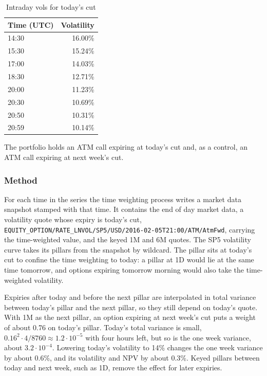 \documentclass[12pt, a4paper]{article}
\begin{document}
\begin{table}[hbt]
\centering
\begin{tabular}{|l|r|}
\hline
Time (UTC) & Volatility \\
\hline
14:30 & 16.00\% \\
15:30 & 15.24\% \\
17:00 & 14.03\% \\
18:30 & 12.71\% \\
20:00 & 11.23\% \\
20:30 & 10.69\% \\
20:50 & 10.31\% \\
20:59 & 10.14\% \\
\hline
\end{tabular}
\caption{Intraday vols for today's cut}
\label{tab:decayseries}
\end{table}

The portfolio holds an ATM call expiring at today's cut and, as a control, an ATM call expiring at next week's cut.

\subsubsection*{Method}

For each time in the series the time weighting process writes a market data snapshot stamped with that time. It contains the
end of day market data, a volatility quote whose expiry is today's cut,
\texttt{EQUITY\_OPTION/RATE\_LNVOL/SP5/USD/2016-02-05T21:00/ATM/AtmFwd}, carrying the time-weighted value, and the keyed 1M
and 6M quotes. The SP5 volatility curve takes its pillars from the snapshot by wildcard. The pillar sits at today's cut
to confine the time weighting to today: a pillar at 1D would lie at the same time tomorrow, and options expiring tomorrow morning
would also take the time-weighted volatility.

Expiries after today and before the next pillar are interpolated in total variance between today's pillar and the
next pillar, so they still depend on today's quote. With 1M as the next pillar, an option expiring at next week's cut
puts a weight of about 0.76 on today's pillar. Today's total variance is small, $0.16^2 \cdot 4/8760 \approx 1.2\cdot
10^{-5}$ with four hours left, but so is the one week variance, about $3.2\cdot 10^{-4}$. Lowering today's volatility to
14\% changes the one week variance by about 0.6\%, and its volatility and NPV by about 0.3\%. Keyed pillars between
today and next week, such as 1D, remove the effect for later expiries.
\end{document}
